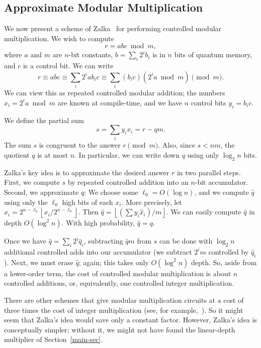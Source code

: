 \documentclass{article} %
\newcommand{\floor}[1]{\left\lfloor #1 \right\rfloor}
\begin{document}
\subsection{Approximate Modular Multiplication}
\label{prelim-mod-mult-sec}

We now present a scheme of Zalka~\cite{Zalka} for performing
controlled modular multiplication.  We wish to compute
$$
r = abc \bmod m,
$$
where $a$ and $m$ are $n$-bit constants, $b = \sum_i 2^i b_i$ is
in $n$ bits of quantum memory, and $c$ is a control bit.
We can write
$$
r \equiv abc \equiv \sum_i 2^i a b_i c \equiv \sum_i (b_i c) \left(2^i a \bmod m\right) \pmod m.
$$
We can view this as repeated controlled modular addition; the
numbers $x_i = 2^i a \bmod m$ are known at compile-time, and
we have $n$ control bits $y_i = b_i c$.

We define the partial sum
$$
s = \sum_i y_i x_i = r - qm.
$$
The sum $s$ is congruent to the answer $r \pmod m$.  Also, since 
$s < nm$, the quotient $q$ is at most $n$.  In particular, we can
write down $q$ using only $\log_2 n$ bits.

Zalka's key idea is to approximate the desired answer $r$ in two
parallel steps.  First, we compute $s$ by repeated controlled addition into
an $n$-bit accumulator.  Second,
we approximate $q$:   We choose some $\ell_0 = O(\log n)$, and we
compute $\hat{q}$ using only the $\ell_0$ high
bits of each $x_i$.  More precisely, let $\hat{x}_i = 2^{n-\ell_0}
\floor{x_i/2^{n-\ell_0}}$.  Then $\hat{q} = \floor{(\sum y_i \hat{x}_i) / m}$.
We can easily compute $\hat{q}$ in depth $O(\log^2 n)$.  With
high probability, $\hat{q} = q$.

Once we have $\hat{q} = \sum_i 2^i \hat{q}_i$, subtracting $\hat{q}m$
from $s$ can be done with $\log_2 n$ additional controlled adds into
our accumulator (we subtract $2^i m$ controlled by $\hat{q}_i$).
Next, we must erase $\hat{q}$; again; this takes only $O(\log^2 n)$
depth.  So, aside from a lower-order term, the cost of controlled
modular multiplication is about $n$ controlled additions,
or, equivalently, one controlled integer multiplication.

There are other schemes that give modular multiplication circuits
at a cost of three times the cost of integer multiplication (see,
for example,~\cite{Dhem}).  So it might seem that Zalka's idea would
save only a constant factor.  However, Zalka's idea is conceptually
simpler; without it, we might not have found the linear-depth
multiplier of Section~\ref{main-sec}.
 
\end{document}
